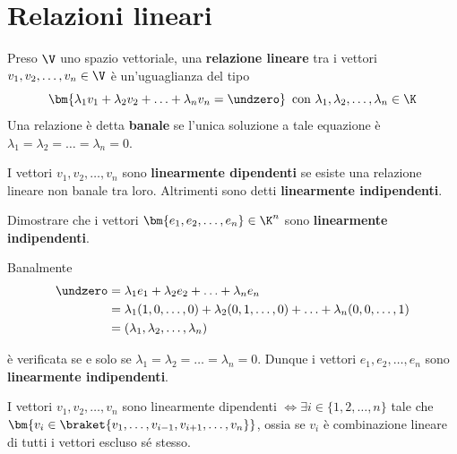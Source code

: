 \documentclass[11pt, a4paper, titlepage, oneside]{scrbook}
\begin{document}
\section{Relazioni lineari}

\begin{Definizione}
\label{def-rel-lin}
Preso $\V$ uno spazio vettoriale, una \textbf{relazione lineare} tra i vettori $v_1, v_2, \ldots, v_n \in \V$ è un'uguaglianza del tipo
\[\bm{\lambda_1 v_1 + \lambda_2 v_2 + \ldots + \lambda_n v_n = \undzero} \enspace \text{con } \lambda_1, \lambda_2, \ldots, \lambda_n \in \K\]
Una relazione è detta \textbf{banale} se l'unica soluzione a tale equazione è $\lambda_1 = \lambda_2 = \ldots = \lambda_n = 0$.
\end{Definizione}

\begin{Definizione}
\label{def-dip-lin}
I vettori $v_1, v_2, \ldots, v_n$ sono \textbf{linearmente dipendenti} se esiste una relazione lineare non banale tra loro. Altrimenti sono detti \textbf{linearmente indipendenti}.
\end{Definizione}

\Esempio \nopagebreak

Dimostrare che i vettori $\bm{e_1, e_2, \ldots, e_n} \in \K^n$ sono \textbf{linearmente indipendenti}. \nopagebreak

Banalmente \nopagebreak
\begin{align*}
 \undzero &= \lambda_1 e_1 + \lambda_2 e_2 + \ldots + \lambda_n e_n \\
 &= \lambda_1 (1,0,\ldots,0) + \lambda_2 (0,1,\ldots,0) + \ldots + \lambda_n( 0,0,\ldots,1) \\
 &= (\lambda_1, \lambda_2, \ldots, \lambda_n)
\end{align*}

è verificata se e solo se $\lambda_1 = \lambda_2 = \ldots = \lambda_n = 0$. Dunque i vettori $e_1, e_2, \ldots, e_n$ sono \textbf{linearmente indipendenti}.

\begin{Osservazione}[]
\label{oss-rel-lin}
I vettori $v_1, v_2, \ldots, v_n$ sono linearmente dipendenti $\iff \exists i \in \{1, 2, \ldots, n\}$ tale che \mbox{$\bm{v_i \in \braket{v_1, \ldots, v_{i-1}, v_{i+1}, \ldots, v_n}}$}, ossia se $v_i$ è combinazione lineare di tutti i vettori escluso sé stesso.
\end{Osservazione}

\Dimostrazione \nopagebreak
\end{document}
